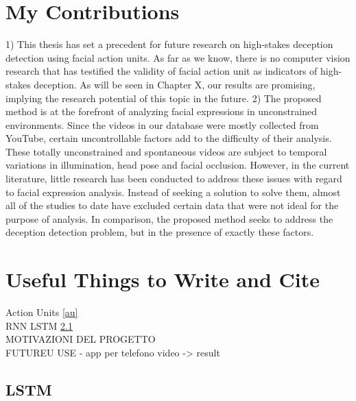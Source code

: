 \section{My Contributions} \label{contrib}
1) This thesis has set a precedent for future research on high-stakes deception detection using facial action units. As far as we know, there is no computer vision research that has testified the validity of facial action unit as indicators of high-stakes deception. As will be seen in Chapter X, our results are  promising, implying the research potential of this topic in the future.
2) The proposed method is at the forefront of analyzing facial expressions in unconstrained environments. Since the videos in our database were mostly collected from YouTube, certain uncontrollable factors add to the difficulty of their analysis. \\
These totally unconstrained and spontaneous videos are subject to temporal variations in illumination, head pose and facial occlusion. However, in the current literature, little research has been conducted to address these issues with regard to facial expression analysis. Instead of seeking a solution to solve them, almost all of the studies to date have excluded certain data that were not ideal for the purpose of analysis. In comparison, the proposed method seeks to address the deception detection problem, but in the presence of exactly these factors.


\section{Useful Things to Write and Cite}
Action Units \ref{au} \\
RNN LSTM \ref{lstm} \\
MOTIVAZIONI DEL PROGETTO\\
FUTUREU USE - app per telefono video -> result



\pagebreak

\subsection{LSTM} \label{lstm}